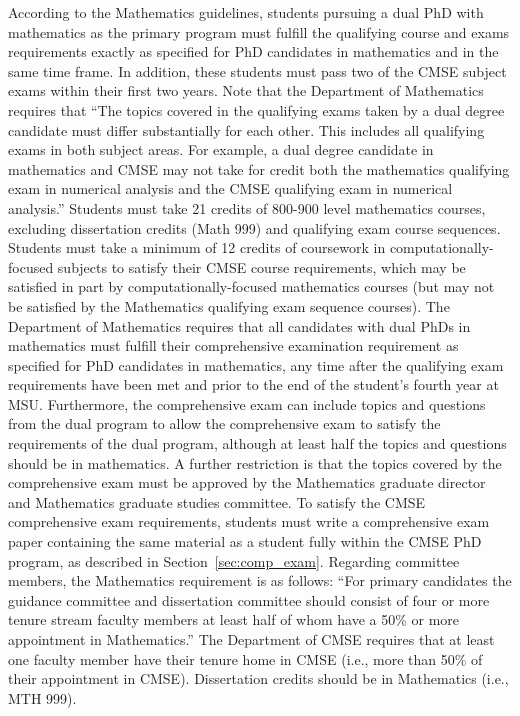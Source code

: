According to the Mathematics guidelines, students pursuing a dual PhD
with mathematics as the primary program must fulfill the qualifying
course and exams requirements exactly as specified for PhD candidates
in mathematics and in the same time frame.  In addition, these
students must pass two of the CMSE subject exams within their first
two years.  Note that the Department of Mathematics requires that
``The topics covered in the qualifying exams taken by a dual degree
candidate must differ substantially for each other. This includes all
qualifying exams in both subject areas. For example, a dual degree
candidate in mathematics and CMSE may not take for credit both the
mathematics qualifying exam in numerical analysis and the CMSE
qualifying exam in numerical analysis.''  Students must take 21
credits of 800-900 level mathematics courses, excluding dissertation
credits (Math 999) and qualifying exam course sequences.  Students
must take a minimum of 12 credits of coursework in
computationally-focused subjects to satisfy their CMSE course
requirements, which may be satisfied in part by computationally-focused
mathematics courses (but may not be satisfied by the Mathematics
qualifying exam sequence courses).  The Department of Mathematics requires that all
candidates with dual PhDs in mathematics must fulfill their
comprehensive examination requirement as specified for PhD candidates
in mathematics, any time after the qualifying exam requirements have
been met and prior to the end of the student's fourth year at MSU.
Furthermore, the comprehensive exam can include topics and questions
from the dual program to allow the comprehensive exam to satisfy the
requirements of the dual program, although at least half the topics
and questions should be in mathematics.  A further restriction is that
the topics covered by the comprehensive exam must be approved by the
Mathematics graduate director and Mathematics graduate studies
committee.  To satisfy the CMSE comprehensive exam requirements,
students must write a comprehensive exam paper containing the same
material as a student fully within the CMSE PhD program, as described
in Section~\ref{sec:comp_exam}.  Regarding committee members, the
Mathematics requirement is as follows: ``For primary candidates the
guidance committee and dissertation committee should consist of four
or more tenure stream faculty members at least half of whom have a
50\% or more appointment in Mathematics.''  The Department of CMSE
requires that at least one faculty member have their tenure home in
CMSE (i.e., more than 50\% of their appointment in CMSE).
Dissertation credits should be in Mathematics (i.e., MTH 999).


